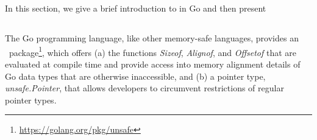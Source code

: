 \section{}

In this section, we give a brief introduction to \unsafe{} in Go and then present %

\subsection{}

The Go programming language, like other memory-safe languages, provides an \unsafe{}~package\footnote{\url{https://golang.org/pkg/unsafe}}, which offers 
(a) the functions \textit{Sizeof}, \textit{Alignof}, and \textit{Offsetof} that are evaluated at compile time and provide access into memory alignment details of Go data types that are otherwise inaccessible, %
and (b) a pointer type, \textit{unsafe.Pointer}, that allows developers to circumvent restrictions of regular pointer types.

